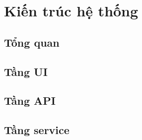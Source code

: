 \section{Kiến trúc hệ thống}
    \subsection{Tổng quan}
    
    \subsection{Tầng UI}
    
    \subsection{Tầng API}
    
    \subsection{Tầng service}
    
    